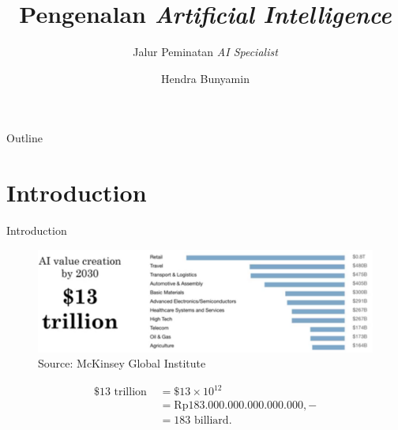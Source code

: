 \documentclass[pdf]{beamer}
\title[AI untuk Semua] %
{\textbf{Pengenalan \textit{Artificial Intelligence}}}
\subtitle
{Jalur Peminatan \textit{AI Specialist}}
\author[Hendra Bunyamin] %
{Hendra Bunyamin}
\institute[ ] %
{
  Program Studi Teknik Informatika\\
  Fakultas Teknologi Informasi\\
  Universitas Kristen Maranatha
}
\theoremstyle{mystyle}
\begin{document}
\begin{frame}
  \titlepage
\end{frame}

\begin{frame}{Outline}
  \tableofcontents
\end{frame}






\section{Introduction}
\begin{frame}{Introduction}
	\begin{figure}[!ht]
		\centering
		\includegraphics[scale=.225]{AI-value-creation}
		\caption{Source: McKinsey Global Institute~\citep{ng2019AIForEveryone}}
		\label{fig:ai-value-creation}
	\end{figure}
	\begin{align*}
	\$13 \text{ trillion } &= \$13 \times 10^{12} \\
	                       &= \text{Rp}183.000.000.000.000.000,- \\
                           &= 183 \text{ billiard}.	                       	
	\end{align*}	  
\end{frame}
\end{document}
